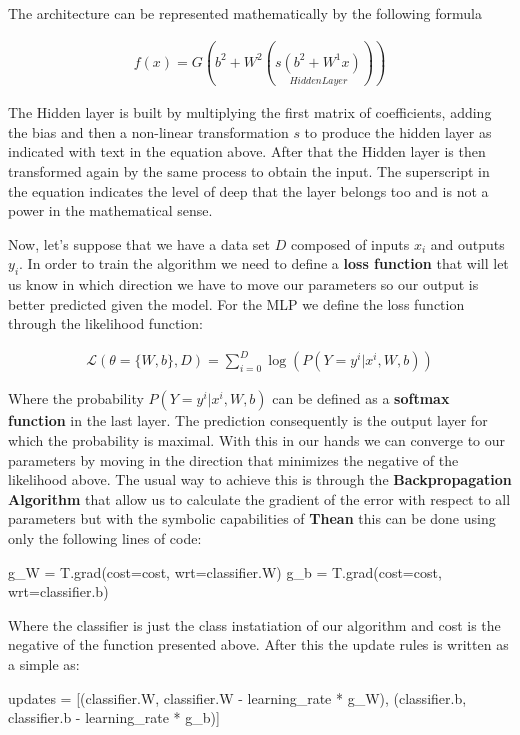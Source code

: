 \documentclass[11pt,a4paper]{article}
\begin{document}
The architecture can be represented mathematically by the following formula

\begin{align*}
f(x) = G(b^2 + W^2 (\underset{Hidden Layer}{s(b^2 + W^1x)}))
\end{align*}

The Hidden layer is built by multiplying the first matrix of coefficients, adding the bias and then a non-linear transformation $s$ to produce the hidden layer as indicated with text in the equation above. After that the Hidden layer is then transformed again by the same process to obtain the input. The superscript in the equation indicates the level of deep that the layer belongs too and is not a power in the mathematical sense. 

Now, let's suppose that we have a data set $D$ composed of inputs $x_i$ and outputs $y_i$. In order to train the algorithm we need to define a \textbf{loss function} that will let us know in which direction we have to move our parameters so our output is better predicted given the model. For the MLP we define the loss function through the likelihood function:

\begin{align*}
\mathcal{L}(\theta = \{W, b\}, D) = \sum_{i=0}^{D} 
\log(P(Y = y^i | x^i , W, b	))
\end{align*}

Where the probability $P(Y = y^i | x^i , W, b	)$ can be defined as a \textbf{softmax function} in the last layer. The prediction consequently is the output layer for which the probability is maximal.  With this in our hands we can converge to our parameters by moving in the direction that minimizes the negative of the likelihood above. The usual way to achieve this is through the \textbf{Backpropagation Algorithm} that allow us to calculate the gradient of the error with respect to all parameters but with the symbolic capabilities of \textbf{Thean} this can be done using only the following lines of code:


\begin{python}
g_W = T.grad(cost=cost, wrt=classifier.W)
g_b = T.grad(cost=cost, wrt=classifier.b)
\end{python}

Where the classifier is just the class instatiation of our algorithm and cost is the negative of the function presented above. After this the update rules is written as a simple as:

\begin{center}
\begin{python}
updates = [(classifier.W, classifier.W - learning_rate * g_W),
           (classifier.b, classifier.b - learning_rate * g_b)]
\end{python}
\end{center}
\end{document}
